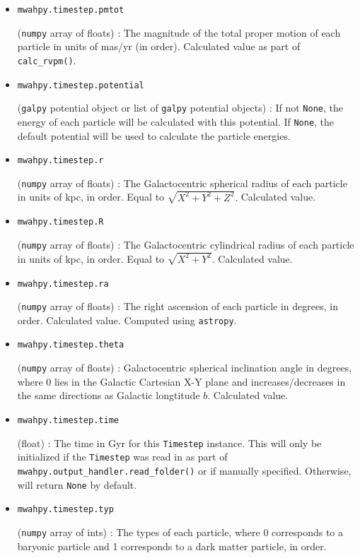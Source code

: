 \documentclass{article}
\begin{document}
\begin{itemize}
\item \verb!mwahpy.timestep.pmtot!

(\verb!numpy! array of floats) : The magnitude of the total proper motion of each particle in units of mas/yr (in order). Calculated value as part of \verb!calc_rvpm()!.

\item \verb!mwahpy.timestep.potential!

(\verb!galpy! potential object or list of \verb!galpy! potential objects) : If not \verb!None!, the energy of each particle will be calculated with this potential. If \verb!None!, the \mwahpy default potential will be used to calculate the particle energies. 

\item \verb!mwahpy.timestep.r!

(\verb!numpy! array of floats) : The Galactocentric spherical radius of each particle in units of kpc, in order. Equal to $\sqrt{X^2 + Y^2 + Z^2}.$ Calculated value.

\item \verb!mwahpy.timestep.R!

(\verb!numpy! array of floats) : The Galactocentric cylindrical radius of each particle in units of kpc, in order. Equal to $\sqrt{X^2 + Y^2}.$ Calculated value.

\item \verb!mwahpy.timestep.ra!

(\verb!numpy! array of floats) : The right ascension of each particle in degrees, in order. Calculated value. Computed using \verb!astropy!.

\item \verb!mwahpy.timestep.theta!

(\verb!numpy! array of floats) : Galactocentric spherical inclination angle in degrees, where 0 lies in the Galactic Cartesian X-Y plane and increases/decreases in the same directions as Galactic longtitude $b$. Calculated value.

\item \verb!mwahpy.timestep.time!

(float) : The time in Gyr for this \verb!Timestep! instance. This will only be initialized if the \verb!Timestep! was read in as part of \verb!mwahpy.output_handler.read_folder()! or if manually specified. Otherwise, will return \verb!None! by default.

\item \verb!mwahpy.timestep.typ!

(\verb!numpy! array of ints) : The types of each particle, where 0 corresponds to a baryonic particle and 1 corresponds to a dark matter particle, in order.


\end{itemize}
\end{document}
